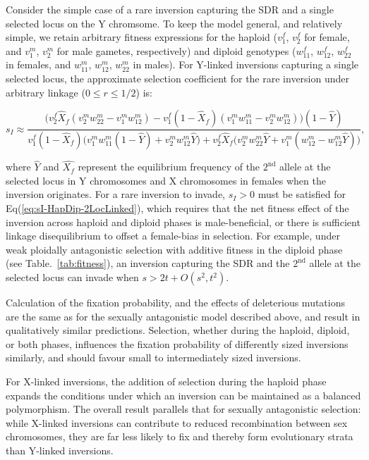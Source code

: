 \documentclass{article}
\begin{document}
Consider the simple case of a rare inversion capturing the SDR and a single selected locus on the Y chromsome. To keep the model general, and relatively simple, we retain arbitrary fitness expressions for the haploid ($v^{f}_{1}$, $v^{f}_{2}$ for female, and $v^{m}_{1}$, $v^{m}_{2}$ for male gametes, respectively) and diploid genotypes ($w^{f}_{11}$, $w^{f}_{12}$, $w^{f}_{22}$ in females, and $w^{m}_{11}$, $w^{m}_{12}$, $w^{m}_{22}$ in males). For Y-linked inversions capturing a single selected locus, the approximate selection coefficient for the rare inversion under arbitrary linkage ($0 \leq r \leq 1/2$) is:

\begin{equation}\label{eq:sI-HapDip-2LocLinked}
	s_I \approx \frac{\big( v^{f}_{2} \hat{X}_f (v^{m}_{2} w^{m}_{22} -v^{m}_{1} w^{m}_{12} ) - v^{f}_{1} (1 - \hat{X}_f) (v^{m}_{1} w^{m}_{11} - v^{m}_{2} w^{m}_{12}) \big) (1 - \hat{Y})} {v^{f}_{1} (1 - \hat{X}_f) \big( v^{m}_{1} w^{m}_{11} (1 - \hat{Y}) + v^{m}_{2} w^{m}_{12} \hat{Y} \big) + v^{f}_{2} \hat{X}_f \big( v^{m}_{2} w^{m}_{22} \hat{Y} + v^{m}_{1} (w^{m}_{12} - w^{m}_{12} \hat{Y}) \big)},
\end{equation}

\noindent where $\hat{Y}$ and $\hat{X_f}$ represent the equilibrium frequency of the $2^{\text{nd}}$ allele at the selected locus in Y chromosomes and X chromosomes in females when the inversion originates. For a rare inversion to invade, $s_I > 0$ must be satisfied for Eq(\ref{eq:sI-HapDip-2LocLinked}), which requires that the net fitness effect of the inversion across haploid and diploid phases is male-beneficial, or there is sufficient linkage disequilibrium to offset a female-bias in selection. For example, under weak ploidally antagonistic selection with additive fitness in the diploid phase (see Table.~\ref{tab:fitness}), an inversion capturing the SDR and the $2^{\text{nd}}$ allele at the selected locus can invade when $s > 2 t + O(s^2,t^2)$.  

Calculation of the fixation probability, and the effects of deleterious mutations are the same as for the sexually antagonistic model described above, and result in qualitatively similar predictions. Selection, whether during the haploid, diploid, or both phases, influences the fixation probability of differently sized inversions similarly, and should favour small to intermediately sized inversions.

For X-linked inversions, the addition of selection during the haploid phase expands the conditions under which an inversion can be maintained as a balanced polymorphism. The overall result parallels that for sexually antagonistic selection: while X-linked inversions can contribute to reduced recombination between sex chromosomes, they are far less likely to fix and thereby form evolutionary strata than Y-linked inversions. \vspace{12pt}
\end{document}
